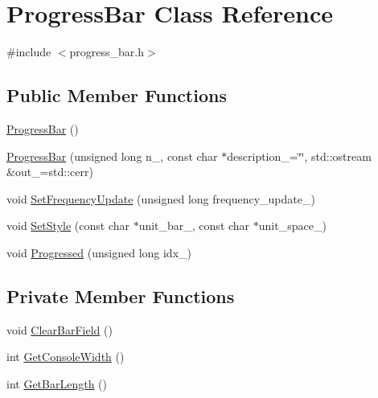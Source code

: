 \hypertarget{class_progress_bar}{}\section{Progress\+Bar Class Reference}
\label{class_progress_bar}


{\ttfamily \#include $<$progress\+\_\+bar.\+h$>$}

\subsection*{Public Member Functions}
\begin{DoxyCompactItemize}
\item 
\mbox{\hyperlink{class_progress_bar_aabdebc9823af01c7567e7546d9f0016f}{Progress\+Bar}} ()
\item 
\mbox{\hyperlink{class_progress_bar_a9dd87a5354a70db0f2dc58ee471ab11a}{Progress\+Bar}} (unsigned long n\+\_\+, const char $\ast$description\+\_\+=\char`\"{}\char`\"{}, std\+::ostream \&out\+\_\+=std\+::cerr)
\item 
void \mbox{\hyperlink{class_progress_bar_ae15db6842561e03940c26c3b15ea98f4}{Set\+Frequency\+Update}} (unsigned long frequency\+\_\+update\+\_\+)
\item 
void \mbox{\hyperlink{class_progress_bar_a677df3f86909de2245babe4e5e456940}{Set\+Style}} (const char $\ast$unit\+\_\+bar\+\_\+, const char $\ast$unit\+\_\+space\+\_\+)
\item 
void \mbox{\hyperlink{class_progress_bar_a10a966740a7c8a67088c75276156285b}{Progressed}} (unsigned long idx\+\_\+)
\end{DoxyCompactItemize}
\subsection*{Private Member Functions}
\begin{DoxyCompactItemize}
\item 
void \mbox{\hyperlink{class_progress_bar_a2f4ce86f697a3f473639e67972a61c57}{Clear\+Bar\+Field}} ()
\item 
int \mbox{\hyperlink{class_progress_bar_a315401227d4273a425477ac9357081d4}{Get\+Console\+Width}} ()
\item 
int \mbox{\hyperlink{class_progress_bar_acd24506c1780a5c335c175e53482ea3c}{Get\+Bar\+Length}} ()
\end{DoxyCompactItemize}
